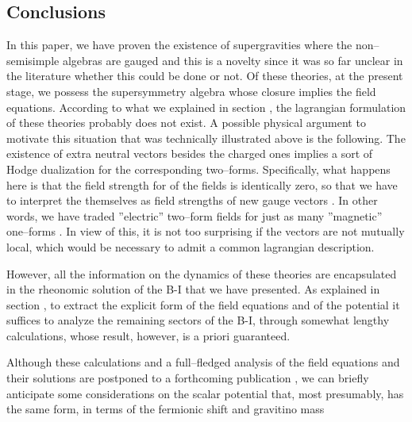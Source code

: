 \documentclass[a4paper,12pt]{article}
\begin{document}
\subsection{Conclusions}
\par
In this paper, we have proven the existence of \coordHE{}
supergravities where the non--semisimple \coordHE{} algebras are
gauged and this is a novelty since it was so far unclear in the
literature whether this could be done or not. Of these theories,
at the present stage, we possess the supersymmetry algebra whose
closure implies the field equations. According to what we
explained in section \coordHE{}, the lagrangian formulation of these
theories probably does not exist. A possible physical argument to
motivate this situation that was technically illustrated above is
the following. The existence of \coordHE{} extra neutral vectors besides
the \coordHE{} charged ones implies a sort of Hodge dualization for the
corresponding two--forms. Specifically, what happens here is that
the field strength \coordHE{} for \coordHE{} of the \coordHE{} fields is
identically zero, so that we have to interpret the \coordHE{}
themselves as field strengths of new gauge vectors \coordHE{}. In
other words, we have traded \coordHE{} ''electric'' two--form fields
\coordHE{} for just as many ''magnetic''  one--forms \coordHE{}. In
view of this, it is not too surprising if the \coordHE{} vectors are
not mutually local, which would be necessary to admit a common
lagrangian description.
\par
However, all the information on the dynamics of these theories are
encapsulated in the rheonomic solution of the B-I that we have
presented. As explained in section \coordHE{}, to extract the explicit
form of the field equations and of the potential it suffices to
analyze the remaining sectors of the B-I, through somewhat lengthy
calculations, whose result, however, is a priori guaranteed.
\par
Although these calculations and a full--fledged analysis of the
field equations and their solutions are postponed to a forthcoming
publication \cite{next}, we can briefly anticipate some
considerations on the scalar potential that, most presumably, has
the same form, in terms of the fermionic shift and gravitino mass
\end{document}
